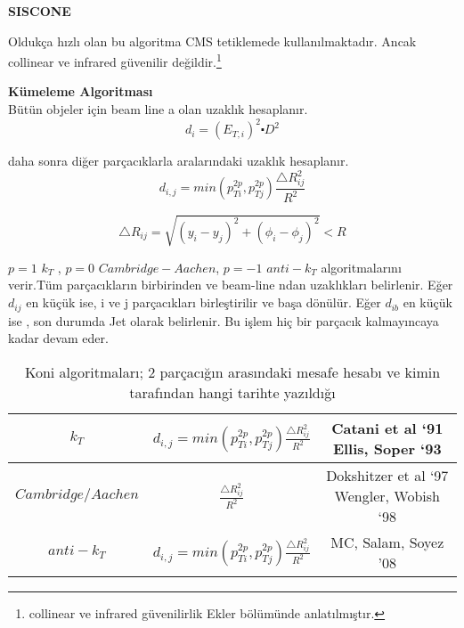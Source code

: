 \par \textbf{SISCONE} 

\par Oldukça hızlı olan bu algoritma CMS tetiklemede kullanılmaktadır. Ancak collinear ve infrared güvenilir değildir.\footnote{collinear ve infrared güvenilirlik Ekler bölümünde anlatılmıştır.}

\par \textbf{Kümeleme Algoritması}\\
Bütün objeler için beam line a olan uzaklık hesaplanır. 
\begin{equation}
d_i = (E_{T,i})^2 \centerdot D^2
\end{equation}

daha sonra diğer parçacıklarla aralarındaki uzaklık hesaplanır.
\begin{equation}
d_{i,j} = min(p_{Ti}^{2p},p_{T j}^{2 p})\frac{\bigtriangleup R_{ij}^2}{R^2}
\end{equation}

\begin{equation}
\bigtriangleup R_{ij}= \sqrt{(y_i-y_j)^2 + (\phi_i - \phi_j)^2} < R
\end{equation}

\par $p=1$ $k_T$ , $p=0$ $Cambridge-Aachen$, $p=-1$ $anti-k_T$ algoritmalarını verir.Tüm parçacıkların birbirinden ve beam-line ndan uzaklıkları belirlenir. Eğer $d_{ij}$ en küçük ise, i ve j parçacıkları birleştirilir ve başa dönülür. Eğer $d_{ib}$ en küçük ise , son durumda Jet olarak belirlenir. Bu işlem hiç bir parçacık kalmayıncaya kadar devam eder.\\
\begin{table}[!htbp]
\centering

\begin{tabular}{|c|c|c|}

\hline 
$k_T$ & $d_{i,j} = min(p_{Ti}^{2p},p_{T j}^{2 p})\frac{\bigtriangleup R_{ij}^2}{R^2}$ & Catani et al ‘91
Ellis, Soper ‘93 \\ 
\hline 
$Cambridge/
Aachen$ & $\frac{\bigtriangleup R_{ij}^2}{R^2}$ & Dokshitzer et al ‘97
Wengler, Wobish ‘98 \\ 
\hline 
$anti-k_T$ & $d_{i,j} = min(p_{Ti}^{2p},p_{T j}^{2 p})\frac{\bigtriangleup R_{ij}^2}{R^2}$ & MC, Salam, Soyez ’08 \\ 
\hline 

\end{tabular} 
\caption{Koni algoritmaları; 2 parçacığın arasındaki mesafe hesabı ve kimin tarafından hangi tarihte yazıldığı}
\end{table}


